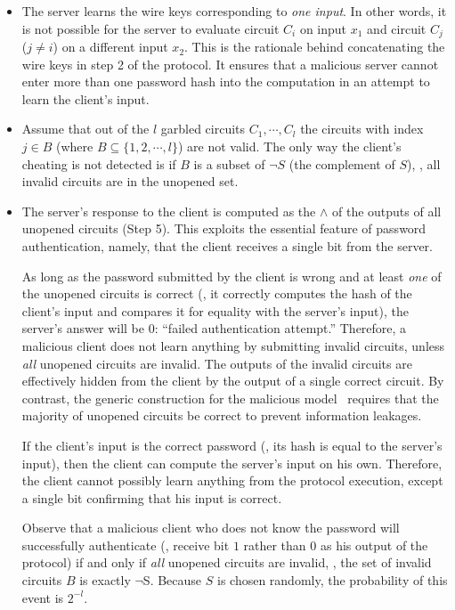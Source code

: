 \begin{itemize}

\item 
The server learns the wire keys corresponding to \emph{one input}.
In other words, it is not possible for the server to evaluate circuit
$C_i$ on input $x_1$ and circuit $C_j$ ($j \not= i$) on a different
input $x_2$.  This is the rationale behind concatenating the wire keys
in step 2 of the protocol.  It ensures that a malicious server cannot
enter more than one password hash into the computation in an attempt to
learn the client's input.

\item 
Assume that out of the $l$ garbled circuits $C_1, \cdots , C_l$ the
circuits with index $j \in B$ (where $B \subseteq \{ 1,2, \cdots , l\}$)
are not valid.  The only way the client's cheating is not detected is
if $B$ is a subset of $\neg S$ (the complement of $S$), \ie, all invalid
circuits are in the unopened set.

\item 
The server's response to the client is computed as the $\wedge$ of the
outputs of all unopened circuits (Step 5).  This exploits the essential
feature of password authentication, namely, that the client receives a
single bit from the server.

As long as the password submitted by the client is wrong and at least
\emph{one} of the unopened circuits is correct (\ie, it correctly
computes the hash of the client's input and compares it for equality
with the server's input), the server's answer will be $0$: ``failed
authentication attempt.''  Therefore, a malicious client does not
learn anything by submitting invalid circuits, unless \emph{all}
unopened circuits are invalid.  The outputs of the invalid circuits are
effectively hidden from the client by the output of a single correct
circuit.  By contrast, the generic construction for the malicious
model~\cite{lindellpinkas-eurocrypt07} requires that the majority of
unopened circuits be correct to prevent information leakages.

If the client's input is the correct password (\ie, its hash is equal
to the server's input), then the client can compute the server's input
on his own.  Therefore, the client cannot possibly learn anything from
the protocol execution, except a single bit confirming that his input
is correct.

Observe that a malicious client who does not know the password will
successfully authenticate (\ie, receive bit $1$ rather than $0$ as his
output of the protocol) if and only if \emph{all} unopened circuits
are invalid, \ie, the set of invalid circuits $B$ is exactly $\neg $S.
Because $S$ is chosen randomly, the probability of this event is $2^{-l}$.


\end{itemize}

